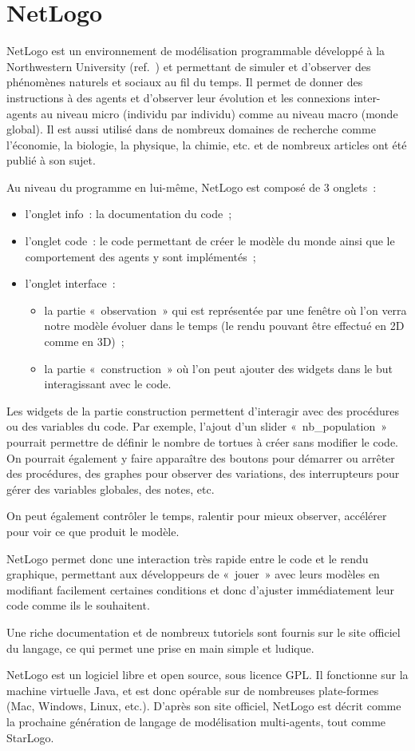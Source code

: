 \section{NetLogo}
\label{NetLogo}

NetLogo est un environnement de modélisation programmable développé à la Northwestern University (ref.~\cite{netlogo}) et permettant de simuler et d'observer des phénomènes naturels et sociaux au fil du temps. Il permet de donner des instructions à des agents et d'observer leur évolution et les connexions inter-agents au niveau micro (individu par individu) comme au niveau macro (monde global).
Il est aussi utilisé dans de nombreux domaines de recherche comme l'économie, la biologie, la physique, la chimie, etc. et de nombreux articles ont été publié à son sujet.

Au niveau du programme en lui-même, NetLogo est composé de 3 onglets~:
\begin{itemize}
	\item l'onglet info~: la documentation du code~;
	\item l'onglet code~: le code permettant de créer le modèle du monde ainsi que le comportement des agents y sont implémentés~;
	\item l'onglet interface~:
          \begin{itemize}
          \item la partie «~observation~» qui est représentée par une fenêtre où l'on verra notre modèle évoluer dans le temps (le rendu pouvant être effectué en 2D comme en 3D)~;
          \item la partie «~construction~» où l'on peut ajouter des widgets dans le but interagissant avec le code.
          \end{itemize}
\end{itemize}

Les widgets de la partie construction permettent d'interagir avec des procédures ou des variables du code. Par exemple, l'ajout d'un slider «~nb\_population~» pourrait permettre de définir le nombre de tortues à créer sans modifier le code. On pourrait également y faire apparaître des boutons pour démarrer ou arrêter des procédures, des graphes pour observer des variations, des interrupteurs pour gérer des variables globales, des notes, etc.

On peut également contrôler le temps, ralentir pour mieux observer, accélérer pour voir ce que produit le modèle.

NetLogo permet donc une interaction très rapide entre le code et le rendu graphique, permettant aux développeurs de «~jouer~» avec leurs modèles en modifiant facilement certaines conditions et donc d'ajuster immédiatement leur code comme ils le souhaitent.

Une riche documentation et de nombreux tutoriels sont fournis sur le site officiel du langage, ce qui permet une prise en main simple et ludique.

NetLogo est un logiciel libre et open source, sous licence GPL. Il fonctionne sur la machine virtuelle Java, et est donc opérable sur de nombreuses plate-formes (Mac, Windows, Linux, etc.).
D'après son site officiel, NetLogo est décrit comme la prochaine génération de langage de modélisation multi-agents, tout comme StarLogo.
